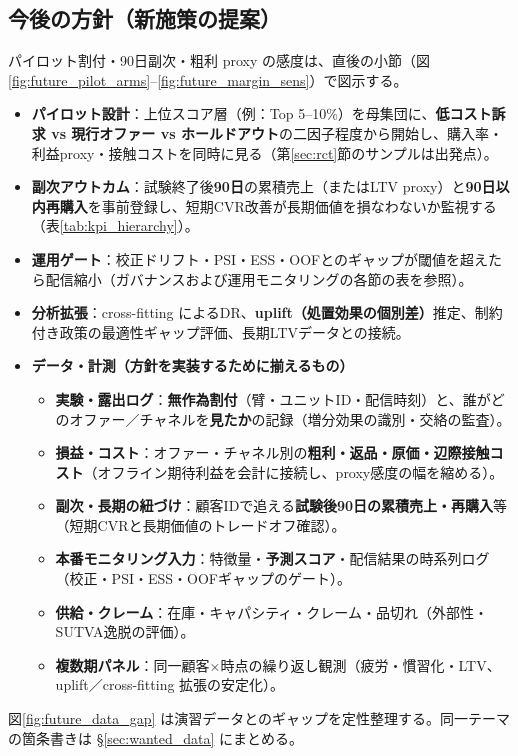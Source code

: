 \documentclass[11pt,a4paper]{article}
\begin{document}
\subsection{今後の方針（新施策の提案）}
\noindent パイロット割付・90日副次・粗利 proxy の感度は、直後の小節（図\ref{fig:future_pilot_arms}--\ref{fig:future_margin_sens}）で図示する。
\begin{itemize}
  \item \textbf{パイロット設計}：上位スコア層（例：Top 5--10\%）を母集団に、\textbf{低コスト訴求 vs 現行オファー vs ホールドアウト}の二因子程度から開始し、購入率・利益proxy・接触コストを同時に見る（第\ref{sec:rct}節のサンプルは出発点）。
  \item \textbf{副次アウトカム}：試験終了後\textbf{90日}の累積売上（またはLTV proxy）と\textbf{90日以内再購入}を事前登録し、短期CVR改善が長期価値を損なわないか監視する（表\ref{tab:kpi_hierarchy}）。
  \item \textbf{運用ゲート}：校正ドリフト・PSI・ESS・OOFとのギャップが閾値を超えたら配信縮小（ガバナンスおよび運用モニタリングの各節の表を参照）。
  \item \textbf{分析拡張}：cross-fitting によるDR、\textbf{uplift（処置効果の個別差）}推定、制約付き政策の最適性ギャップ評価、長期LTVデータとの接続。
  \item \textbf{データ・計測（方針を実装するために揃えるもの）}
  \begin{itemize}\setlength{\itemsep}{0.15em}
    \item \textbf{実験・露出ログ}：\textbf{無作為割付}（臂・ユニットID・配信時刻）と、誰がどのオファー／チャネルを\textbf{見たか}の記録（増分効果の識別・交絡の監査）。
    \item \textbf{損益・コスト}：オファー・チャネル別の\textbf{粗利・返品・原価・辺際接触コスト}（オフライン期待利益を会計に接続し、proxy感度の幅を縮める）。
    \item \textbf{副次・長期の紐づけ}：顧客IDで追える\textbf{試験後90日の累積売上・再購入}等（短期CVRと長期価値のトレードオフ確認）。
    \item \textbf{本番モニタリング入力}：特徴量・\textbf{予測スコア}・配信結果の時系列ログ（校正・PSI・ESS・OOFギャップのゲート）。
    \item \textbf{供給・クレーム}：在庫・キャパシティ・クレーム・品切れ（外部性・SUTVA逸脱の評価）。
    \item \textbf{複数期パネル}：同一顧客×時点の繰り返し観測（疲労・慣習化・LTV、uplift／cross-fitting 拡張の安定化）。
  \end{itemize}
\end{itemize}
\noindent 図\ref{fig:future_data_gap} は演習データとのギャップを定性整理する。同一テーマの箇条書きは \S\ref{sec:wanted_data} にまとめる。
\end{document}
